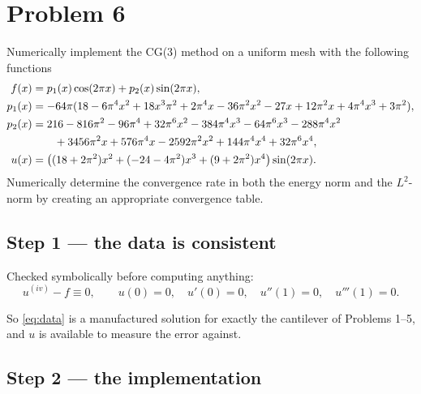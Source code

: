 \documentclass[11pt]{article}
\begin{document}
 

\vspace{4pt}

\section*{Problem 6}

Numerically implement the CG(3) method on a uniform mesh with the following
functions
\begin{align}
  f(x) &= p_{1}(x)\cos(2\pi x) + p_{2}(x)\sin(2\pi x),\notag\\
  p_{1}(x) &= -64\pi(18 - 6\pi^{4}x^{2} + 18x^{3}\pi^{2} + 2\pi^{4}x
              - 36\pi^{2}x^{2} - 27x + 12\pi^{2}x + 4\pi^{4}x^{3} + 3\pi^{2}),\notag\\
  p_{2}(x) &= 216 - 816\pi^{2} - 96\pi^{4} + 32\pi^{6}x^{2} - 384\pi^{4}x^{3}
              - 64\pi^{6}x^{3} - 288\pi^{4}x^{2}\notag\\
           &\qquad + 3456\pi^{2}x + 576\pi^{4}x - 2592\pi^{2}x^{2}
              + 144\pi^{4}x^{4} + 32\pi^{6}x^{4},\notag\\
  u(x) &= \bigl((18 + 2\pi^{2})x^{2} + (-24 - 4\pi^{2})x^{3}
           + (9 + 2\pi^{2})x^{4}\bigr)\sin(2\pi x).
  \label{eq:data}
\end{align}
Numerically determine the convergence rate in both the energy norm and the
$L^{2}$-norm by creating an appropriate convergence table.

\subsection*{Step 1 --- the data is consistent}

\begin{steps}
\item Checked symbolically before computing anything:
\[
  u^{(iv)}-f\equiv 0,\qquad u(0)=0,\quad u'(0)=0,\quad u''(1)=0,\quad u'''(1)=0 .
\]
\item So \eqref{eq:data} is a manufactured solution for exactly the cantilever
      of Problems 1--5, and $u$ is available to measure the error against.
\end{steps}

\subsection*{Step 2 --- the implementation}
\end{document}
